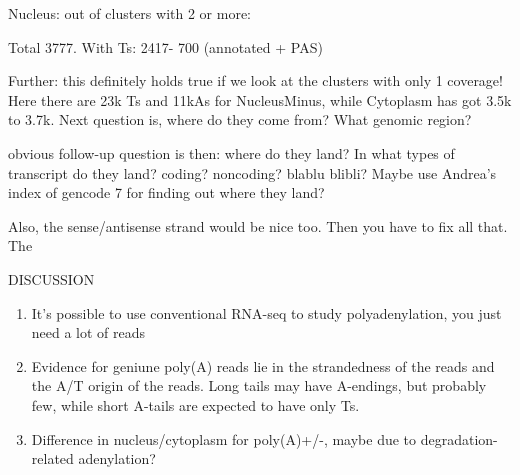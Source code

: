 \documentclass[a4paper]{article}
\begin{document}
Nucleus: out of clusters with 2 or more:

Total 3777. With Ts: 2417- 700 (annotated + PAS)

Further: this definitely holds true if we look at the clusters with only 1
coverage! Here there are 23k Ts and 11kAs for NucleusMinus, while Cytoplasm has
got 3.5k to 3.7k. Next question is, where do they come from? What genomic
region?

obvious follow-up question is then: where do they land? In what types of
transcript do they land? coding? noncoding? blablu blibli? Maybe use Andrea's
index of gencode 7 for finding out where they land?

Also, the sense/antisense strand would be nice too. Then you have to fix all
that.
The




DISCUSSION

\begin{enumerate}
	\item It's possible to use conventional RNA-seq to study polyadenylation,
		you just need a lot of reads
	\item Evidence for geniune poly(A) reads lie in the strandedness of the
		reads and the A/T origin of the reads. Long tails may have A-endings,
		but probably few, while short A-tails are expected to have only Ts.
	\item Difference in nucleus/cytoplasm for poly(A)+/-, maybe due to
		degradation-related adenylation? 

\end{enumerate}



%
\end{document}
